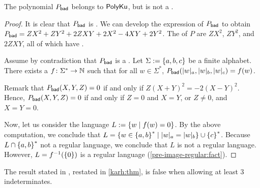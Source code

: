 \begin{lemma}
    \label{thm:counter-example}
    The polynomial $P_{\mathsf{bad}}$ belongs to $\mathsf{PolyKu}$,
    but is not a .
\end{lemma}
\begin{proof}
    It is clear that $P_{\mathsf{bad}}$ is . We can develop
    the expression of $P_{\mathsf{bad}}$ to 
    obtain
    $P_{\mathsf{bad}} = ZX^2 + ZY^2 + 2ZXY + 2X^2 -4XY + 2Y^2$.
    The  of $P$
    are $ZX^2$, $ZY^2$, and $2ZXY$, all of which have
    .

    Assume by contradiction that $P_{\mathsf{bad}}$ is a .
    Let $\Sigma \mathrel{:=} \mathopen{\{} a,b,c \mathclose{\}}$ be a finite alphabet.
    There exists a 
     $f \colon \Sigma^* \to \mathbb{N}$
    such that for all $w \in \Sigma^*$,
    $\BadPoly(\card[a]{w}, \card[b]{w}, \card[c]{w}) = f(w)$.

    Remark that $P_{\mathsf{bad}}(X,Y,Z) = 0$
    if and only if $Z(X+Y)^2 = -2 (X-Y)^2$. Hence,
    $P_{\mathsf{bad}}(X,Y,Z)=0$ if and only if $Z = 0$ and $X = Y$, or 
    $Z \neq 0$, and $X = Y = 0$.

    Now, let us consider the language $L \mathrel{:=} \mathopen{\{} w \mid  f(w) = 0 \mathclose{\}}$. By the
    above computation, we conclude that $L = \setof{ w \in \set{a,b}^* }{
    \card[a]{w} = \card[b]{w} } \cup \set{ c }^*$.
    Because $L \cap \mathopen{\{} a,b \mathclose{\}}^*$ not a regular language,
    we
    conclude that $L$ is not a regular language.
    However, $L = f^{-1}(\mathopen{\{} 0 \mathclose{\}})$ is a regular language
    (\cref{pre-image-regular:fact}). 
\end{proof}

\begin{corollary}
    The result stated in \cite[Theorem 3.3]{KARH77}, restated
    in \cref{karh:thm}, is false
    when allowing at least $3$ indeterminates.
\end{corollary}

